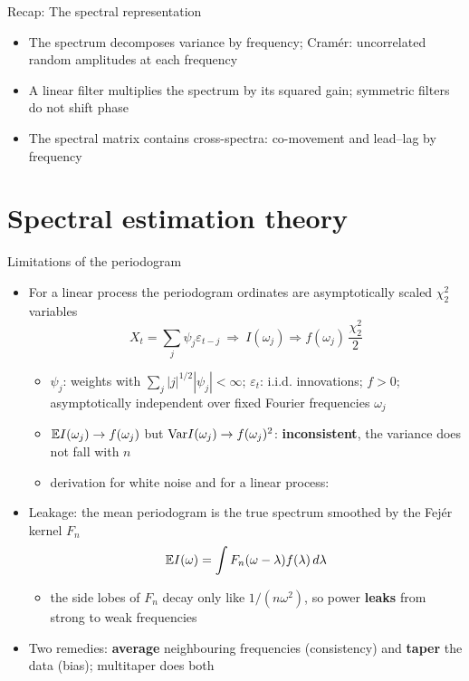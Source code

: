 \begin{frame}{Recap: The spectral representation}
\itemsize{\small}
\begin{itemize}
    \item The spectrum decomposes variance by frequency; Cramér: uncorrelated random amplitudes at each frequency
    \item A linear filter multiplies the spectrum by its squared gain; symmetric filters do not shift phase
    \item The spectral matrix contains cross-spectra: co-movement and lead--lag by frequency
\end{itemize}
\end{frame}


\section{Spectral estimation theory}

\begin{frame}{Limitations of the periodogram}
\itemsize{\small}
\begin{itemize}
    \item For a linear process the periodogram ordinates are asymptotically scaled $\chi^2_2$ variables 
    \[ X_t = \sum_j\psi_j\varepsilon_{t-j} \ \Rightarrow\ I(\omega_j) \Rightarrow f(\omega_j)\,\frac{\chi^2_2}{2} \]
    \begin{itemize}
        \item $\psi_j$: weights with $\sum_j|j|^{1/2}|\psi_j| < \infty$; $\varepsilon_t$: i.i.d. innovations; $f > 0$; asymptotically independent over fixed Fourier frequencies $\omega_j$
        \item $\mathbb{E} I(\omega_j) \to f(\omega_j)$ but $\text{Var} I(\omega_j) \to f(\omega_j)^2$: \textbf{inconsistent}, the variance does not fall with $n$
        \item derivation for white noise and for a linear process:   %
    \end{itemize}
    \item Leakage: the mean periodogram is the true spectrum smoothed by the Fejér kernel $F_n$
    \[ \mathbb{E} I(\omega) = \int F_n(\omega - \lambda)f(\lambda)\,d\lambda \]
    \begin{itemize}
        \item the side lobes of $F_n$ decay only like $1/(n\omega^2)$, so power \textbf{leaks} from strong to weak frequencies
    \end{itemize}
    \item Two remedies: \textbf{average} neighbouring frequencies (consistency) and \textbf{taper} the data (bias); multitaper does both
\end{itemize}
\end{frame}

